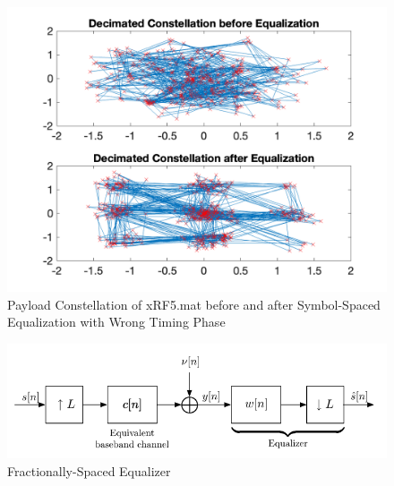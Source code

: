 \begin{figure}[h!]
    \centering
    \includegraphics[scale=0.4]{figures/bad_timing_phase_part2.png}
    \caption{Payload Constellation of xRF5.mat before and after Symbol-Spaced Equalization with Wrong Timing Phase}
    \label{fig:payload-equal-wrong-phase-part2}
\end{figure}


\begin{figure}[h!]
    \centering
    \includegraphics[scale=0.4]{figures/fractionally_spaced.png}
    \caption{Fractionally-Spaced Equalizer}
    \label{fig:frac-equal}
\end{figure}

